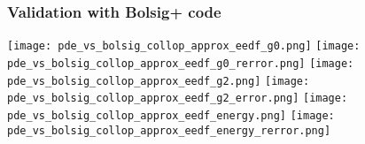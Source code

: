\documentclass[landscape,archE,fontscale=0.285]{baposter} %
\begin{document}
\begin{poster}
{\begin{multicols}{2}
\subsubsection*{Validation with Bolsig+ code}
\begin{center}
  \texttt{[image: pde\_vs\_bolsig\_collop\_approx\_eedf\_g0.png]}
  \texttt{[image: pde\_vs\_bolsig\_collop\_approx\_eedf\_g0\_rerror.png]}
  \texttt{[image: pde\_vs\_bolsig\_collop\_approx\_eedf\_g2.png]}
  \texttt{[image: pde\_vs\_bolsig\_collop\_approx\_eedf\_g2\_error.png]}
  \texttt{[image: pde\_vs\_bolsig\_collop\_approx\_eedf\_energy.png]}
  \texttt{[image: pde\_vs\_bolsig\_collop\_approx\_eedf\_energy\_rerror.png]}
\end{center}
\end{multicols}
}



% 


\end{poster}
\end{document}
